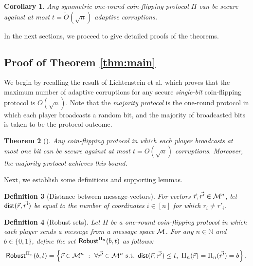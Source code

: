 \documentclass[11pt,letterpaper]{article}
\theoremstyle{plain}
\newtheorem{theorem}{Theorem}[section]
\newtheorem{corollary}[theorem]{Corollary}
\newtheorem{definition}[theorem]{Definition}
\theoremstyle{definition}
\newcommand{\NN}{\mathbb{N}}
\newcommand{\cM}{{\cal M}}
\begin{document}
\begin{corollary}
Any symmetric one-round coin-flipping protocol $\Pi$ can be secure against at most $t=\widetilde{O}(\sqrt n)$ adaptive corruptions.
\end{corollary}
\iffalse
\begin{proof}
Suppose, for contradiction, that there exists a symmetric one-round coin-flipping protocol $\Pi$ which is secure against more than $\widetilde{O}(\sqrt n)$
adaptive corruptions. Then, by Theorem \ref{thm:minmax}, there exists a one-round coin-flipping protocol $\Pi'$ which is secure
against more than $\widetilde{O}(\sqrt n)$ \emph{strong} adaptive corruptions. This contradicts Theorem \ref{thm:main}.
\end{proof}
\fi

In the next sections, we proceed to give detailed proofs of the theorems.


\subsection{Proof of Theorem \ref{thm:main}}


We begin by recalling the result of Lichtenstein et al. \cite{LLS89} which proves that the maximum number of adaptive corruptions for any secure \emph{single-bit} 
coin-flipping protocol is $O(\sqrt n)$. Note that the \emph{majority protocol} is the one-round protocol in which each player broadcasts a random bit,
and the majority of broadcasted bits is taken to be the protocol outcome.

\begin{theorem}[\cite{LLS89}]\label{thm:lls}
Any coin-flipping protocol in which each player broadcasts at most one bit can be secure against at most $t=O(\sqrt n)$ corruptions.
Moreover, the majority protocol achieves this bound.
\end{theorem}


Next, we establish some definitions and supporting lemmas.

\newcommand{\dist}{{\sf dist}}
\begin{definition}[Distance between message-vectors]
For vectors $\vec{r},\vec{r'}\in\cM^n$, let $\dist(\vec{r},\vec{r'})$ be equal to the number of coordinates $i\in[n]$
for which $r_i\neq r'_i$.
\end{definition}

\newcommand{\Robust}{{\sf Robust}}
\begin{definition}[Robust sets]
Let $\Pi$ be a one-round coin-flipping protocol in which each player sends a message from a message space $\cM$.
For any $n\in\NN$ and $b\in\{0,1\}$, define the set $\Robust^{\Pi_n}(b,t)$ as follows:
$$\Robust^{\Pi_n}(b,t)=\left\{\vec{r}\in\cM^n ~:~ \forall\vec{r'}\in\cM^n \mbox{ s.t. } \dist(\vec{r},\vec{r'})\leq t, ~\Pi_n(\vec{r})=\Pi_n(\vec{r'})=b\right\}.$$
\end{definition}
\end{document}
